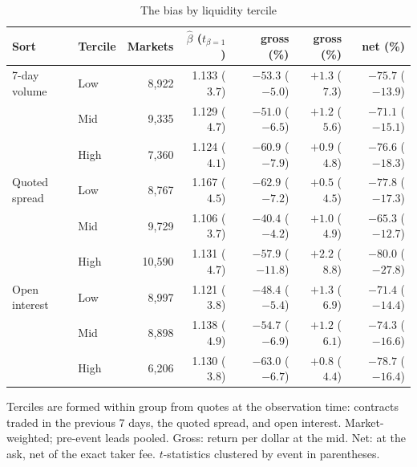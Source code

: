 \begin{table}[htbp]
\centering
\begin{threeparttable}
\caption{The bias by liquidity tercile}\label{tab:xs-liq}
\scriptsize
\begin{tabular}{@{}llrrrrr@{}}
\toprule
Sort & Tercile & Markets & $\hat\beta$ ($t_{\beta=1}$) & \LS{} gross (\%) & \FAV{} gross (\%) & \LS{} net (\%) \\
\midrule
7-day volume & Low & 8{,}922 & 1.133 ($3.7$) & $-53.3$ ($-5.0$) & $+1.3$ ($7.3$) & $-75.7$ ($-13.9$) \\
 & Mid & 9{,}335 & 1.129 ($4.7$) & $-51.0$ ($-6.5$) & $+1.2$ ($5.6$) & $-71.1$ ($-15.1$) \\
 & High & 7{,}360 & 1.124 ($4.1$) & $-60.9$ ($-7.9$) & $+0.9$ ($4.8$) & $-76.6$ ($-18.3$) \\
Quoted spread & Low & 8{,}767 & 1.167 ($4.5$) & $-62.9$ ($-7.2$) & $+0.5$ ($4.5$) & $-77.8$ ($-17.3$) \\
 & Mid & 9{,}729 & 1.106 ($3.7$) & $-40.4$ ($-4.2$) & $+1.0$ ($4.9$) & $-65.3$ ($-12.7$) \\
 & High & 10{,}590 & 1.131 ($4.7$) & $-57.9$ ($-11.8$) & $+2.2$ ($8.8$) & $-80.0$ ($-27.8$) \\
Open interest & Low & 8{,}997 & 1.121 ($3.8$) & $-48.4$ ($-5.4$) & $+1.3$ ($6.9$) & $-71.4$ ($-14.4$) \\
 & Mid & 8{,}898 & 1.138 ($4.9$) & $-54.7$ ($-6.9$) & $+1.2$ ($6.1$) & $-74.3$ ($-16.6$) \\
 & High & 6{,}206 & 1.130 ($3.8$) & $-63.0$ ($-6.7$) & $+0.8$ ($4.4$) & $-78.7$ ($-16.4$) \\
\bottomrule
\end{tabular}
\begin{tablenotes}\footnotesize
\item Terciles are formed within group from quotes at the observation time: contracts traded in
the previous 7 days, the quoted spread, and open interest. Market-weighted; pre-event leads
pooled. Gross: return per dollar at the mid. Net: at the ask, net of the exact taker fee.
$t$-statistics clustered by event in parentheses.
\end{tablenotes}
\end{threeparttable}
\end{table}

